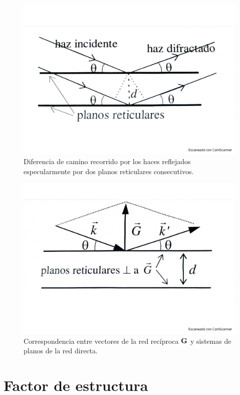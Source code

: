 \begin{figure}[h!] \centering
    \includegraphics[scale=0.35]{Cuerpo/Ch_02/Fotos_libro 6.pdf}
    \caption{Diferencia de camino recorrido por los haces reflejados especularmente por dos planos reticulares consecutivos.}
    \label{Fig:02-06}
\end{figure}
    
\begin{figure}[h!] \centering
    \includegraphics[scale=0.35]{Cuerpo/Ch_02/Fotos_libro 7.pdf}
    \caption{Correspondencia entre vectores de la red recíproca $\mathbf{G}$ y sistemas de planos de la red directa.}
    \label{Fig:02-07}
\end{figure}

\section{Factor de estructura}

